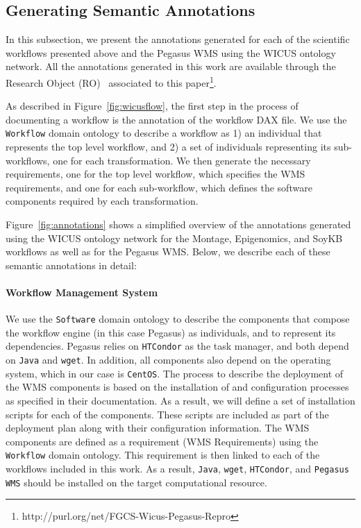 \subsection{Generating Semantic Annotations}

In this subsection, we present the annotations generated for each of the scientific 
workflows presented above and the Pegasus WMS using the WICUS ontology
network. All the annotations generated in this work are available through the 
Research Object (RO)~\cite{researchObjects} associated to this paper\footnote{http://purl.org/net/FGCS-Wicus-Pegasus-Repro}.

 As described in Figure~\ref{fig:wicusflow}, the first step in the process of 
documenting a workflow is the annotation of the workflow DAX file. We use the 
\texttt{Workflow} domain ontology to describe a workflow as 1) an individual that 
represents the top level workflow, and 2) a set of individuals representing its 
sub-workflows, one for each transformation. We then generate the necessary 
requirements, one for the top level workflow, which specifies the WMS requirements,
and one for each sub-workflow, which defines the software components required 
by each transformation. 


Figure~\ref{fig:annotations} shows a simplified overview of the annotations generated 
using the WICUS ontology network for the Montage, Epigenomics, and SoyKB 
workflows as well as for the Pegasus WMS. Below, we describe each of these
semantic annotations in detail:


\paragraph{\textbf{Workflow Management System}}
We use the \texttt{Software} domain ontology to describe the components that
compose the workflow engine (in this case Pegasus) as individuals, and to 
represent its dependencies. Pegasus relies on \texttt{HTCondor} as the task manager, and 
both depend on \texttt{Java} and \texttt{wget}. In addition, all components also
depend on the operating system, which in our case is \texttt{CentOS}. The process
to describe the deployment of the WMS components is based on the installation of
and configuration processes as specified in their documentation. As a result, we will
define a set of installation scripts for each of the components. These scripts are 
included as part of the deployment plan along with their configuration information.
The WMS components are defined as a requirement (WMS Requirements) using
the \texttt{Workflow} domain ontology. This requirement is then linked to each
of the workflows included in this work. As a result, \texttt{Java}, \texttt{wget}, 
\texttt{HTCondor}, and \texttt{Pegasus WMS} should be installed on the target
computational resource.


